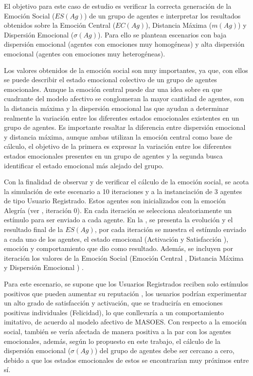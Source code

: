 
El objetivo para este caso de estudio es verificar la correcta generación de la
Emoción Social ($ES(Ag)$) de un grupo de agentes
e interpretar los resultados obtenidos sobre la Emoción Central ($EC(Ag)$), Distancia Máxima ($m(Ag)$) y
Dispersión Emocional ($\sigma(Ag)$).
Para ello se plantean escenarios con baja dispersión emocional (agentes con emociones muy homogéneas)
y alta dispersión emocional (agentes con emociones muy heterogéneas).

Los valores obtenidos de la emoción social son muy importantes, ya que, con ellos
se puede describir el estado emocional colectivo de un grupo de agentes emocionales.
Aunque la emoción central
puede dar una idea sobre en que cuadrante del modelo afectivo se conglomeran la mayor cantidad de agentes,
son la distancia máxima y la dispersión emocional las que ayudan a determinar realmente la variación entre los diferentes estados emocionales
existentes en un grupo de agentes.
Es importante resaltar la diferencia entre dispersión emocional y distancia máxima, aunque ambas utilizan la emoción central
como base de cálculo, el objetivo de la primera es expresar la variación entre los diferentes estados emocionales presentes en un grupo de agentes
y la segunda busca identificar el estado emocional más alejado del grupo.


Con la finalidad de observar y de verificar el cálculo de la emoción social,
se acota la simulación de este escenario a 10
iteraciones y a la instanciación de 3 agentes de tipo Usuario Registrado.
Estos agentes son inicializados con la emoción Alegría (ver , iteración 0).
En cada iteración se selecciona aleatoriamente un estímulo para ser enviado a cada agente.
En la , se presenta la evolución y el resultado final de la $ES(Ag)$,
por cada iteración se muestra el estímulo enviado a cada uno de los
agentes, el estado emocional (Activación  y Satisfacción ),
emoción y comportamiento que dio como resultado. Además, se incluyen por iteración los valores de la Emoción Social
(Emoción Central , Distancia Máxima  y
Dispersión Emocional ) .

Para este escenario, se supone que los Usuarios Registrados reciben solo estímulos
positivos que pueden aumentar su reputación ,
los usuarios podrían experimentar un alto grado de satisfacción y activación, que se traduciría
en emociones positivas individuales (Felicidad), lo que conllevaría a un comportamiento imitativo,
de acuerdo al modelo afectivo de MASOES. Con respecto a la emoción social, también se
vería afectada de manera positiva a la par con los agentes emocionales,
además, según lo propuesto en este trabajo, el cálculo de la dispersión
emocional ($\sigma(Ag)$) del grupo de agentes debe ser cercano a cero, debido a que los estados
emocionales de estos se encontrarían muy próximos entre sí.

